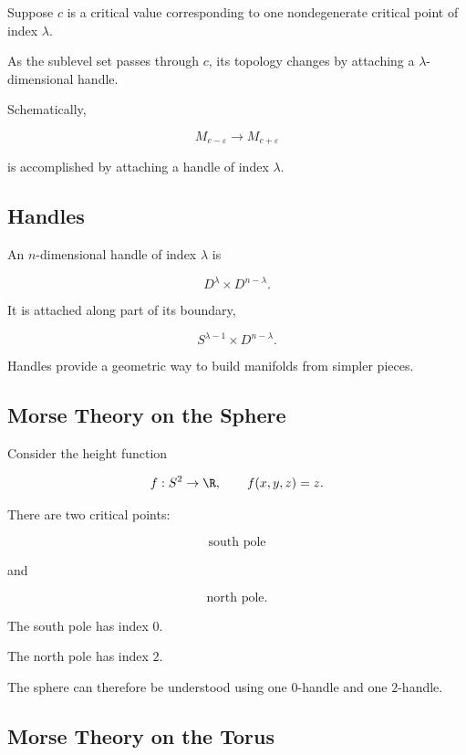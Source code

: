 Suppose \(c\) is a critical value corresponding to one nondegenerate
critical point of index \(\lambda\).

As the sublevel set passes through \(c\), its topology changes by attaching
a \(\lambda\)-dimensional handle.

Schematically,

\[
\boxed{
M_{c-\varepsilon}
\longrightarrow
M_{c+\varepsilon}
}
\]

is accomplished by attaching a handle of index \(\lambda\).

\subsection{Handles}
\label{subsec:handles-differential-topology}

An \(n\)-dimensional handle of index \(\lambda\) is

\[
\boxed{
D^\lambda\times D^{n-\lambda}.
}
\]

It is attached along part of its boundary,

\[
\boxed{
S^{\lambda-1}\times D^{n-\lambda}.
}
\]

Handles provide a geometric way to build manifolds from simpler pieces.

\subsection{Morse Theory on the Sphere}
\label{subsec:morse-sphere}

Consider the height function

\[
f:S^2\to\R,
\qquad
f(x,y,z)=z.
\]

There are two critical points:

\[
\boxed{
\text{south pole}
}
\]

and

\[
\boxed{
\text{north pole}.
}
\]

The south pole has index \(0\).

The north pole has index \(2\).

The sphere can therefore be understood using one \(0\)-handle and one
\(2\)-handle.

\subsection{Morse Theory on the Torus}
\label{subsec:morse-torus}

